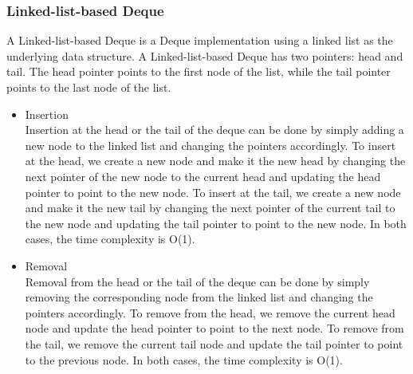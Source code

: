 \documentclass[a4paper, 11pt, oneside]{book} %
\begin{document}
\subsubsection{Linked-list-based Deque}
A Linked-list-based Deque is a Deque implementation using a linked list as the underlying data structure. A Linked-list-based Deque has two pointers: head and tail. The head pointer points to the first node of the list, while the tail pointer points to the last node of the list.

\begin{itemize}
    \item Insertion
    \\
    Insertion at the head or the tail of the deque can be done by simply adding a new node to the linked list and changing the pointers accordingly. To insert at the head, we create a new node and make it the new head by changing the next pointer of the new node to the current head and updating the head pointer to point to the new node. To insert at the tail, we create a new node and make it the new tail by changing the next pointer of the current tail to the new node and updating the tail pointer to point to the new node. In both cases, the time complexity is O(1).

    \item Removal
    \\
    Removal from the head or the tail of the deque can be done by simply removing the corresponding node from the linked list and changing the pointers accordingly. To remove from the head, we remove the current head node and update the head pointer to point to the next node. To remove from the tail, we remove the current tail node and update the tail pointer to point to the previous node. In both cases, the time complexity is O(1).
    
\end{itemize}
\end{document}
